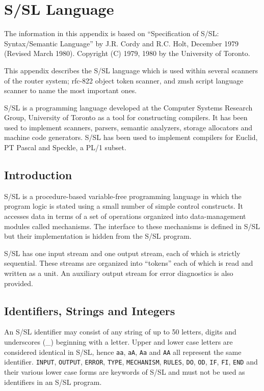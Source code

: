 \section{S/SL Language}

The information in this appendix is based on 
``Specification of S/SL: Syntax/Semantic Language'' by 
J.R. Cordy and R.C. Holt, December 1979 (Revised March 1980).
Copyright (C) 1979, 1980 by the  University of  Toronto.

This appendix describes the S/SL language which is used
within several scanners of the router system; rfc-822
object token scanner, and zmsh script language scanner
to name the most important ones.

S/SL is a programming language developed at
the Computer Systems Research Group,
University of Toronto as a tool for constructing compilers.
It has been used to implement scanners, parsers, semantic
analyzers, storage allocators and machine code generators.
S/SL  has  been  used  to implement compilers for Euclid, PT
Pascal and Speckle, a PL/1 subset.


\subsection{Introduction}

S/SL is a procedure-based variable-free programming 
language in which the program logic is  stated  using  a  small
number  of  simple  control constructs.  It accesses data in
terms of a set of operations organized into  data-management
modules  called  mechanisms.   The interface to these 
mechanisms is defined in S/SL but their implementation is  hidden
from the S/SL program.

S/SL has one input stream and one output stream, each of
which is strictly sequential.  These streams  are  organized
into ``tokens'' each of which is read and written as a unit.
An auxiliary output stream for  error  diagnostics  is  also
provided.




\subsection{Identifiers, Strings and Integers}

An  S/SL identifier may consist of any string of up to 50
letters, digits and underscores (\_) beginning with a letter.
Upper  and  lower  case  letters are considered identical in
S/SL, hence {\tt aa}, {\tt aA}, {\tt Aa} and {\tt AA} 
all represent the same identifier.  {\tt INPUT}, {\tt OUTPUT}, 
{\tt ERROR}, {\tt TYPE}, {\tt MECHANISM}, {\tt RULES}, 
{\tt DO}, {\tt OD}, {\tt IF}, {\tt FI}, {\tt END} 
and their various lower case forms are  keywords
of  S/SL and must not be used as identifiers in an S/SL 
program.

